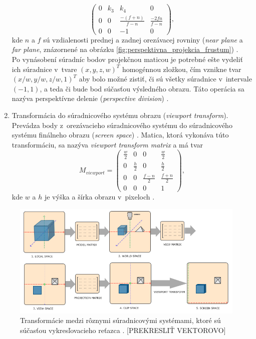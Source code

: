 \begin{enumerate}
$$\begin{pmatrix}
    0 & k_3 & k_4 & 0 \\
    0 & 0 & \frac{-(f+n)}{f-n} & \frac{-2fn}{f-n} \\
    0 & 0 & -1 & 0
    \end{pmatrix}
    \mathrm{,}
    $$
    kde $n$ a $f$ sú vzdialenosti prednej a zadnej orezávacej rovniny (\emph{near plane} a \emph{far plane}, znázornené na obrázku \ref{fig:perspektivna_projekcia_frustum}) \cite{ahn_projection_matrix}. \\ 
    Po vynásobení súradníc bodov projekčnou maticou je potrebné ešte vydeliť ich súradnice v~tvare $(x, y, z, w)^T$ homogénnou zložkou, čím vznikne tvar $(x/w, y/w, z/w, 1)^T$ aby bolo možné zistiť, či sú všetky súradnice v~intervale $(-1, 1)$, a teda či bude bod súčasťou výsledného obrazu. Táto operácia sa nazýva perspektívne delenie (\emph{perspective division}) \cite{de_vries_coordinate_systems}.  
    \item Transformácia do súradnicového systému obrazu (\emph{viewport transform}). Prevádza body z~orezávacieho súradnicového systému do súradnicového systému finálneho obrazu (\emph{\mbox{screen} space}) \cite{de_vries_coordinate_systems}. Matica, ktorá vykonáva túto transformáciu, sa nazýva \emph{viewport transform matrix} a má tvar
    $$
    M_{viewport} = 
    \begin{pmatrix}
    \frac{w}{2} & 0 & 0 & \frac{w}{2} \\
    0 & \frac{h}{2} & 0 & \frac{h}{2} \\
    0 & 0 & \frac{f-n}{2} & \frac{f+n}{2} \\
    0 & 0 & 0 & 1
    \end{pmatrix}
    \mathrm{,}
    $$
    kde $w$ a $h$ je výška a šírka obrazu v~pixeloch \cite{ahn_viewport_transform}.
\end{enumerate}

\begin{figure}[h]
    \centering
    \includegraphics[width=1\linewidth]{text_prace/obrazky-figures/suradnicove_systemy.png}
    \caption[Transformácie medzi rôznymi súradnicovými systémami, ktoré sú súčasťou vykresľovacieho reťazca.]{Transformácie medzi rôznymi súradnicovými systémami, ktoré sú súčasťou vykresľovacieho reťazca \cite{de_vries_coordinate_systems}. [PREKRESLIŤ VEKTOROVO]}
    \label{fig:suradnicove_systemy}
\end{figure}

